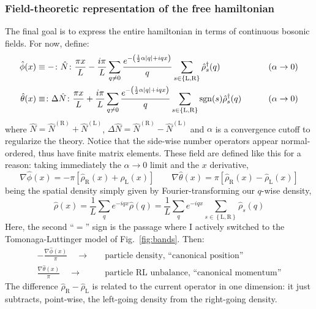 \subsubsection{Field-theoretic representation of the free hamiltonian}

The final goal is to express the entire hamiltonian in terms of continuous bosonic fields. For now, define:
\[
\begin{aligned}
	\hat \phi(x) &\equiv - \colon \hat N \colon \frac{\pi x}{L} - \frac{i\pi}{L} \sum_{q \neq 0} \frac{e^{-\left( \frac{1}{2} \alpha \abs{q} + iqx \right)}}{q} \sum_{s \in \left\{\mathrm L, \mathrm R\right\}} \hat \rho_s^\dagger (q) &&\qquad\left( \alpha \to 0 \right) \\
	\hat \theta(x) &\equiv \colon \Delta \hat N \colon \frac{\pi x}{L} + \frac{i\pi}{L} \sum_{q \neq 0} \frac{e^{-\left( \frac{1}{2} \alpha \abs{q} + iqx \right)}}{q} \sum_{s \in \left\{\mathrm L, \mathrm R\right\}} \mathrm{sgn}(s) \hat \rho_s^\dagger (q) &&\qquad\left( \alpha \to 0 \right)
\end{aligned}
\]
where $\hat N = \hat N^{(\mathrm R)} + \hat N^{(\mathrm L)}$, $\Delta \hat N = \hat N^{(\mathrm R)} - \hat N^{(\mathrm L)}$ and $\alpha$ is a convergence cutoff to regularize the theory. Notice that the side-wise number operators appear normal-ordered, thus have finite matrix elements.
These field are defined like this for a reason: taking immediately the $\alpha \to 0$ limit and the $x$ derivative,
\begin{equation}\label{eq:fields-density-equations}
	\nabla \hat \phi(x) = - \pi \left[ \hat \rho_\mathrm{R}(x) + \hat \rho_\mathrm{L}(x) \right]
	\qquad
	\nabla \hat \theta(x) = \pi \left[ \hat \rho_\mathrm{R}(x) - \hat \rho_\mathrm{L}(x) \right]
\end{equation}
being the spatial density simply given by Fourier-transforming our $q$-wise density,
\[
	\hat \rho(x) = \frac{1}{L} \sum_q e^{-iqx} \hat \rho(q) = \frac{1}{L} \sum_q e^{-iqx} \sum_{s \in \left\{\mathrm L, \mathrm R\right\}} \hat \rho_s(q)
\]
Here, the second ``$=$'' sign is the passage where I actively switched to the Tomonaga-Luttinger model of Fig.~\ref{fig:bands}.
Then:
\[
\begin{aligned}
	- \frac{\nabla \hat \phi(x)}{\pi} \quad\to\quad &\text{particle density, ``canonical position''}\\
	\frac{\nabla \hat \theta(x)}{\pi} \quad\to\quad &\text{particle $\mathrm{RL}$ unbalance, ``canonical momentum''}
\end{aligned}
\]
The difference $\hat \rho_\mathrm{R} - \hat \rho_\mathrm{L}$ is related to the current operator in one dimension: it just subtracts, point-wise, the left-going density from the right-going density.

